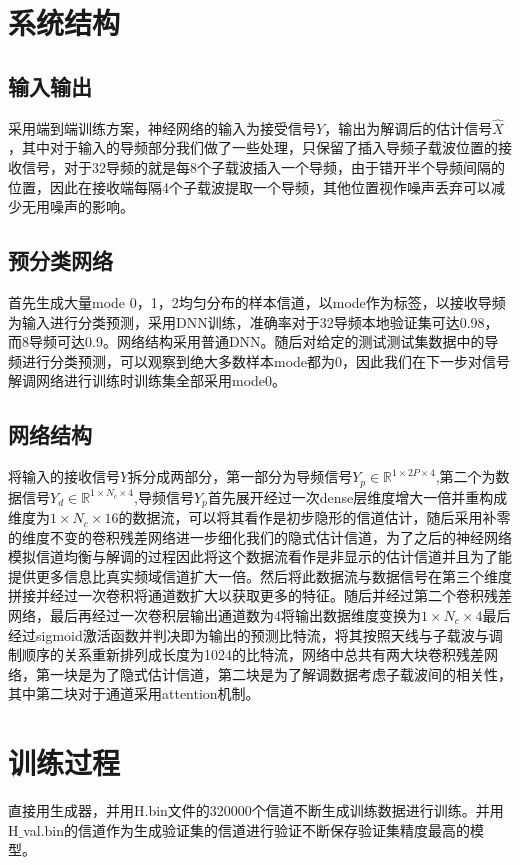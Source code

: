 \documentclass[UTF8]{article}
\begin{document}
\section{系统结构}
\subsection{输入输出}
采用端到端训练方案，神经网络的输入为接受信号$Y$，输出为解调后的估计信号$\widehat{X}$，其中对于输入的导频部分我们做了一些处理，只保留了插入导频子载波位置的接收信号，对于32导频的就是每8个子载波插入一个导频，由于错开半个导频间隔的位置，因此在接收端每隔4个子载波提取一个导频，其他位置视作噪声丢弃可以减少无用噪声的影响。
\subsection{预分类网络}
首先生成大量mode 0，1，2均匀分布的样本信道，以mode作为标签，以接收导频为输入进行分类预测，采用DNN训练，准确率对于32导频本地验证集可达0.98，而8导频可达0.9。网络结构采用普通DNN。随后对给定的测试测试集数据中的导频进行分类预测，可以观察到绝大多数样本mode都为0，因此我们在下一步对信号解调网络进行训练时训练集全部采用mode0。
\subsection{网络结构}
将输入的接收信号$Y$拆分成两部分，第一部分为导频信号$Y_p \in \mathbb{R}^{1\times 2P\times 4}$,第二个为数据信号$Y_d \in \mathbb{R}^{1\times N_c\times 4}$,导频信号$Y_p$首先展开经过一次dense层维度增大一倍并重构成维度为$1\times N_c \times 16$的数据流，可以将其看作是初步隐形的信道估计，随后采用补零的维度不变的卷积残差网络进一步细化我们的隐式估计信道，为了之后的神经网络模拟信道均衡与解调的过程因此将这个数据流看作是非显示的估计信道并且为了能提供更多信息比真实频域信道扩大一倍。然后将此数据流与数据信号在第三个维度拼接并经过一次卷积将通道数扩大以获取更多的特征。随后并经过第二个卷积残差网络，最后再经过一次卷积层输出通道数为4将输出数据维度变换为$1\times N_c\times 4$最后经过sigmoid激活函数并判决即为输出的预测比特流，将其按照天线与子载波与调制顺序的关系重新排列成长度为1024的比特流，网络中总共有两大块卷积残差网络，第一块是为了隐式估计信道，第二块是为了解调数据考虑子载波间的相关性，其中第二块对于通道采用attention机制。
\section{训练过程}
直接用生成器，并用H.bin文件的320000个信道不断生成训练数据进行训练。并用H$\_$val.bin的信道作为生成验证集的信道进行验证不断保存验证集精度最高的模型。
\end{document}
